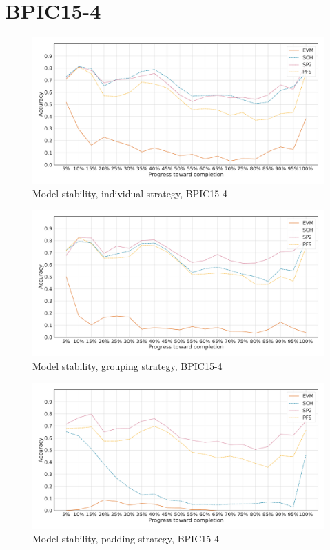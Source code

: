 \section*{BPIC15-4}
\begin{figure}[!htb]
    \centering
    \includegraphics[width=\textwidth]{gfx/bpic2015_4/individual_stability.pdf}
    \caption{Model stability, individual strategy, BPIC15-4}
    \label{fig:bpic15-4-individual-stability}
\end{figure}
\begin{figure}[!htb]
    \centering
    \includegraphics[width=\textwidth]{gfx/bpic2015_4/grouped_stability.pdf}
    \caption{Model stability, grouping strategy, BPIC15-4}
    \label{fig:bpic15-4-grouped-stability}
\end{figure}
\begin{figure}[!htb]
    \centering
    \includegraphics[width=\textwidth]{gfx/bpic2015_4/padded_stability.pdf}
    \caption{Model stability, padding strategy, BPIC15-4}
    \label{fig:bpic15-4-padded-stability}
\end{figure}

